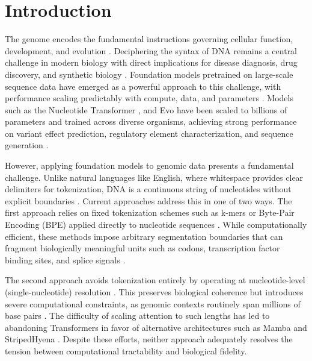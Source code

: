 \documentclass{article}
\theoremstyle{plain}
\theoremstyle{definition}
\theoremstyle{remark}
\begin{document}
\section{Introduction}

The genome encodes the fundamental instructions governing cellular function, development, and evolution \citep{human_genome,encode}. Deciphering the syntax of DNA remains a central challenge in modern biology with direct implications for disease diagnosis, drug discovery, and synthetic biology \citep{Zhou2023, adibi2025recentadvancesapplicationsopen}. Foundation models pretrained on large-scale sequence data have emerged as a powerful approach to this challenge, with performance scaling predictably with compute, data, and parameters \citep{kaplan2020scalinglawsneurallanguage}. Models such as the Nucleotide Transformer \citep{DallaTorre2024}, and Evo \citep{Nguyen2024, Brixi2025.02.18.638918} have been scaled to billions of parameters and trained across diverse organisms, achieving strong performance on variant effect prediction, regulatory element characterization, and sequence generation \citep{brianphage, bioreason}.


However, applying foundation models to genomic data presents a fundamental challenge. Unlike natural languages like English, where whitespace provides clear delimiters for tokenization, DNA is a continuous string of nucleotides without explicit boundaries \citep{Ji2021, Lindsey2025}. Current approaches address this in one of two ways. The first approach relies on fixed tokenization schemes such as k-mers or Byte-Pair Encoding (BPE) applied directly to nucleotide sequences \citep{Zhou2023, DallaTorre2024, sennrich2016neuralmachinetranslationrare}. While computationally efficient, these methods impose arbitrary segmentation boundaries that can fragment biologically meaningful units such as codons, transcription factor binding sites, and splice signals \citep{bostrom2020bytepairencodingsuboptimal, CodonTransformer}.

The second approach avoids tokenization entirely by operating at nucleotide-level (single-nucleotide) resolution \citep{Nguyen2024}. This preserves biological coherence but introduces severe computational constraints, as genomic contexts routinely span millions of base pairs \citep{benegas2024genomiclanguagemodelsopportunities}. The difficulty of scaling attention to such lengths has led to abandoning Transformers in favor of alternative architectures such as Mamba and StripedHyena \citep{gu2024mambalineartimesequencemodeling, dao2024transformersssmsgeneralizedmodels, poli2023hyenahierarchylargerconvolutional, ku2025systemsalgorithmsconvolutionalmultihybrid}. Despite these efforts, neither approach adequately resolves the tension between computational tractability and biological fidelity.
\end{document}
